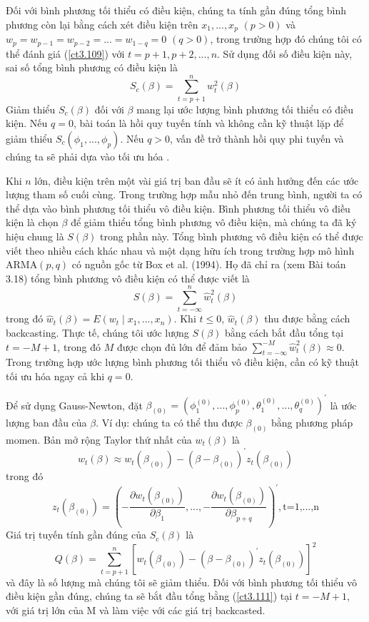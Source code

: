 \documentclass[12pt, a4paper,oneside]{book}
\theoremstyle{definition}
\begin{document}
Đối với bình phương tối thiểu có điều kiện, chúng ta tính gần đúng tổng bình phương còn lại bằng cách xét điều kiện trên $ x_1, ..., x_p $ $ (p >0) $ và $ w_p = w_{p-1} =w_{p-2}=... =w_{1-q}= 0$ $ (q > 0) $, trong trường hợp đó chúng tôi có thể đánh giá (\ref{ct3.109}) với $ t = p + 1, p + 2 ,..., n $. Sử dụng đối số điều kiện này, sai số tổng bình phương có điều kiện là
$$ S_c(\beta)=\sum_{t=p+1}^{n}w^2_t(\beta) $$
Giảm thiểu $ S_c(\beta) $ đối với $ \beta $  mang lại ước lượng bình phương tối thiểu có điều kiện. Nếu $ q = 0 $, bài toán là hồi quy tuyến tính và không cần kỹ thuật lặp để giảm thiểu $  S_c(\phi_1,...,\phi_p) $. Nếu $ q > 0 $, vấn đề trở thành hồi quy phi tuyến và chúng ta sẽ phải dựa vào tối ưu hóa .

Khi $ n $ lớn, điều kiện trên một vài giá trị ban đầu sẽ ít có ảnh hưởng đến các ước lượng tham số cuối cùng. Trong trường hợp mẫu nhỏ đến trung bình, người ta có thể dựa vào bình phương tối thiểu vô điều kiện. Bình phương tối thiểu vô điều kiện là chọn $ \beta $ để giảm thiểu tổng bình phương vô điều kiện, mà chúng ta đã ký hiệu chung là $ S(\beta) $ trong phần này. Tổng bình phương vô điều kiện có thể được viết theo nhiều cách khác nhau và một dạng hữu ích trong trường hợp mô hình ARMA$ (p, q) $ có nguồn gốc từ Box et al. (1994). Họ đã chỉ ra (xem Bài toán 3.18) tổng bình phương vô điều kiện có thể được viết là
$$ S(\beta)=\sum_{t=-\infty}^{n}\hat{w}^{2}_{t}(\beta) $$
trong đó $ \hat{w}_{t}(\beta) = E(w_t\mid x_1,..., x_n) $. Khi $ t \leq 0 $, $ \hat{w}_{t}(\beta) $ thu được bằng cách backcasting. Thực tế, chúng tôi ước lượng $ S(\beta) $ bằng cách bắt đầu tổng tại $ t = −M + 1 $, trong đó $ M $ được chọn đủ lớn để đảm bảo $ \sum_{t=-\infty}^{-M}\hat{w}^{2}_{t}(\beta)\approx0 $. Trong trường hợp ước lượng bình phương tối thiểu vô điều kiện, cần có kỹ thuật tối ưu hóa ngay cả khi $ q = 0 $.

Để sử dụng Gauss-Newton, đặt $\beta_{(0)}=(\phi^{(0)}_{1},...,\phi^{(0)}_{p},\theta^{(0)}_{1},...,\theta^{(0)}_{q})^{\prime} $ là ước lượng ban đầu của $ \beta $. Ví dụ: chúng ta có thể thu được $ \beta_{(0)} $ bằng phương pháp momen. Bản mở rộng Taylor thứ nhất của $ w_t(\beta) $ là
\begin{equation}
w_t(\beta)\approx w_t(\beta_{(0)})-(\beta-\beta_{(0)})^\prime z_t(\beta_{(0)}) \label{ct3.110} 
\end{equation}
trong đó
$$ z_t(\beta_{(0)})=(-\dfrac{\partial w_t(\beta_{(0)})}{\partial \beta_1},...,-\dfrac{\partial w_t(\beta_{(0)})}{\partial \beta_{p+q}})^\prime, \text{t=1,...,n} $$
Giá trị tuyến tính gần đúng của $ S_c(\beta) $ là
\begin{equation}
Q(\beta)=\sum_{t=p+1}^{n}[w_t(\beta_{(0)})-(\beta-\beta_{(0)})^\prime z_t(\beta_{(0)})]^2 \label{ct3.111}
\end{equation}
và đây là số lượng mà chúng tôi sẽ giảm thiểu. Đối với bình phương tối thiểu vô điều kiện gần đúng, chúng ta sẽ bắt đầu tổng bằng (\ref{ct3.111}) tại $ t=−M + 1 $, với giá trị lớn của M và làm việc với các giá trị backcasted. 
\end{document}
